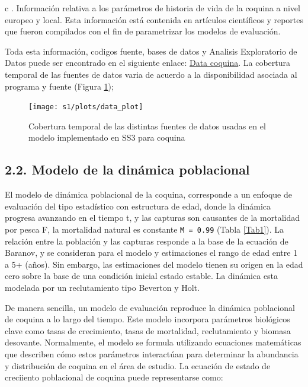 \documentclass[
]{article}
\begin{document}
c . Información relativa a los parámetros de historia de vida de la coquina a nivel europeo y local. Esta información está contenida en artículos científicos y reportes que fueron compilados con el fin de parametrizar los modelos de evaluación.

Toda esta información, codigos fuente, bases de datos y Analisis Exploratorio de Datos puede ser encontrado en el siguiente enlace: \href{https://mauromardones.github.io/EDA_Donux_trunculus_2023/}{Data coquina}. La cobertura temporal de las fuentes de datos varia de acuerdo a la disponibilidad asociada al programa y fuente (Figura \ref{fig:data});

\begin{figure}[H]

{\centering \texttt{[image: s1/plots/data\_plot]} 

}

\caption{\label{fig:data}Cobertura temporal de las distintas fuentes de datos usadas en el modelo implementado en SS3 para coquina}\label{fig:data}
\end{figure}

\hypertarget{modelo-de-la-dinuxe1mica-poblacional}{%
\subsection{2.2. Modelo de la dinámica poblacional}\label{modelo-de-la-dinuxe1mica-poblacional}}

El modelo de dinámica poblacional de la coquina, corresponde a un enfoque de evaluación del tipo estadístico con estructura de edad, donde la dinámica progresa avanzando en el tiempo t, y las capturas son causantes de la mortalidad por pesca F, la mortalidad natural es constante \texttt{M\ =\ 0.99} (Tabla \ref{Tab1}). La relación entre la población y las capturas responde a la base de la ecuación de Baranov, y se consideran para el modelo y estimaciones el rango de edad entre 1 a 5+ (años). Sin embargo, las estimaciones del modelo tienen su origen en la edad cero sobre la base de una condición inicial estado estable. La dinámica esta modelada por un reclutamiento tipo Beverton y Holt.

De manera sencilla, un modelo de evaluación reproduce la dinámica poblacional de coquina a lo largo del tiempo. Este modelo incorpora parámetros biológicos clave como tasas de crecimiento, tasas de mortalidad, reclutamiento y biomasa desovante. Normalmente, el modelo se formula utilizando ecuaciones matemáticas que describen cómo estos parámetros interactúan para determinar la abundancia y distribución de coquina en el área de estudio. La ecuación de estado de creciiento poblacional de coquina puede representarse como:
\end{document}
